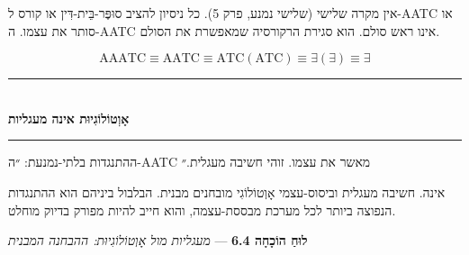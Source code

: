 \documentclass[10pt, openany, oneside]{book}
\renewcommand{\normalsize}{\fontsize{10}{13}\selectfont}
\begin{document}
אין מקרה שלישי (שלישי נמנע, פרק 5). כל ניסיון להציב סוּפֶּר-בֵּית-דִּין או קורס ל-AATC או סותר את עצמו. ה-AATC אינו ראש סולם. הוא סגירת הרקורסיה שמאפשרת את הסולם.

$$\text{AAATC} \equiv \text{AATC} \equiv \text{ATC}(\text{ATC}) \equiv \exists(\exists) \equiv \exists$$

\vspace{1.5em}


\begin{center}
    \rule{0.3\textwidth}{0.4pt}\\[0.5em]
    {\normalsize\bfseries\textsc{אָוְטוֹלוֹגִיוּת אינה מעגליות}}\\[0.3em]
    \rule{0.3\textwidth}{0.4pt}
\end{center}

\vspace{1em}

\noindent ההתנגדות בלתי-נמנעת: ״ה-AATC מאשר את עצמו. זוהי חשיבה מעגלית.״

אינה. חשיבה מעגלית וביסוס-עצמי אָוְטוֹלוֹגִי מובחנים מבנית. הבלבול ביניהם הוא ההתנגדות הנפוצה ביותר לכל מערכת מבססת-עצמה, והוא חייב להיות מפורק בדיוק מוחלט.

\vspace{0.5em}

\textbf{לוּחַ הוֹכָחָה 6.4} --- \textit{מעגליות מול אָוְטוֹלוֹגִיוּת: ההבחנה המבנית}

\vspace{0.5em}
\end{document}
